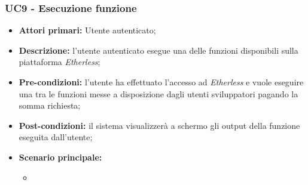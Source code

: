 \subsubsection{UC9 - Esecuzione funzione}
\begin{itemize}
	\item \textbf{Attori primari:} Utente autenticato;
	\item \textbf{Descrizione:} l'utente autenticato esegue una delle funzioni disponibili sulla piattaforma \textit{Etherless}; 
	\item \textbf{Pre-condizioni:} l'utente ha effettuato l'accesso ad \textit{Etherless} e vuole eseguire una tra le funzioni messe a disposizione dagli utenti sviluppatori pagando la somma richiesta;
	\item \textbf{Post-condizioni:} il sistema visualizzerà a schermo gli output della funzione eseguita dall'utente;
	\item \textbf{Scenario principale:} 
	\begin{itemize}
		\item 
	\end{itemize}
\end{itemize}